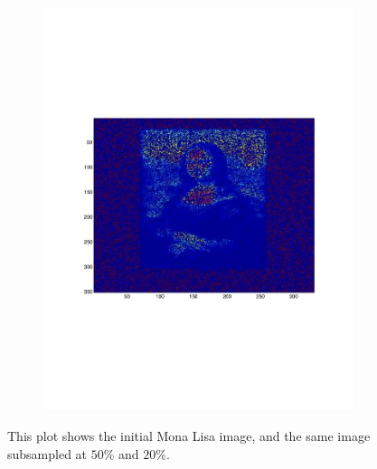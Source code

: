 \begin{figure}[h!tbp]
\begin{subfigure}[a]{0.3\textwidth}
        \includegraphics[width=\textwidth]{img/p5_mona2.pdf}
    \end{subfigure}
    \caption{This plot shows the initial Mona Lisa image, and the same image subsampled at $50\%$ and $20\%$.} 
\end{figure}

